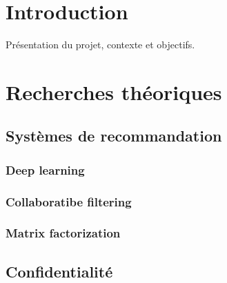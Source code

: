 \documentclass{article}
\begin{document}
\tableofcontents
\newpage

\section*{Introduction}
Présentation du projet, contexte et objectifs.

\section{Recherches théoriques}
\subsection{Systèmes de recommandation}
\subsubsection{Deep learning}
\subsubsection{Collaboratibe filtering}
\subsubsection{Matrix factorization}
\subsection{Confidentialité}
\end{document}
